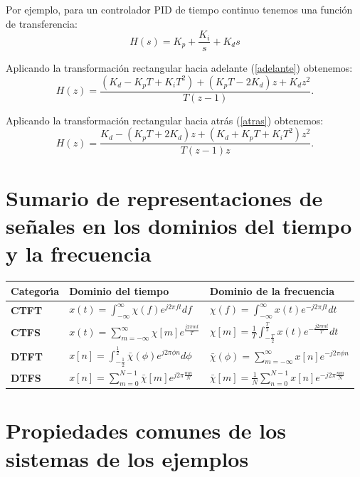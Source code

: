 \documentclass[11pt,a4paper,openany]{book}
\begin{document}
Por ejemplo, para un controlador PID de tiempo continuo tenemos una funci\'{o}n de transferencia:
\begin{equation}
	H(s) = K_{p} + \frac{K_{i}}{s} + K_{d} s
\end{equation}

Aplicando la transformaci\'{o}n rectangular hacia adelante (\ref{adelante}) obtenemos:
\begin{equation}
	H(z) = \frac{(K_{d} - K_{p} T + K_{i} T^{2}) + (K_{p} T - 2 K_{d}) z + K_{d} z^2}{T (z - 1)}.
\end{equation}

Aplicando la transformaci\'{o}n rectangular hacia atr\'{a}s (\ref{atras}) obtenemos:
\begin{equation}
	H(z) = \frac{K_{d} - (K_{p} T + 2 K_{d}) z + (K_{d} + K_{p} T + K_{i} T^{2}) z^2}{T (z - 1) z}.
\end{equation}

\section{Sumario de representaciones de se\~{n}ales en los dominios del tiempo y la frecuencia}

\begin{center}
	\renewcommand{\arraystretch}{2}
	\begin{tabular}{p{2cm} p{5.5cm} p{6cm}}
		\textbf{Categor\'{\i}a} & \textbf{Dominio del tiempo} & \textbf{Dominio de la frecuencia} \\ \hline
		\textbf{CTFT} & $x(t) =\int_{-\infty }^{\infty }\chi(f) e^{j2\pi ft}df$ & $\chi(f) =\int_{-\infty }^{\infty }x(t) e^{-j2\pi ft}dt$ \\ 
		\textbf{CTFS} & $x(t) =\sum_{m=-\infty }^{\infty }\chi[m] e^{\frac{j2\pi mt}{T}}$ & $\chi[m] =\frac{1}{T}\int_{-\frac{T}{2}}^{\frac{T}{2}}x(t) e^{-\frac{j2\pi mt}{T}}dt$ \\ 
		\textbf{DTFT} & $x[n] =\int_{-\frac{1}{2}}^{\frac{1}{2}}\bar{\chi}(\phi) e^{j2\pi \phi n}d\phi $ & $\bar{\chi}(\phi) =\sum_{m=-\infty }^{\infty }x[n] e^{-j2\pi \phi n}$ \\ 
		\textbf{DTFS} & $x[n] =\sum_{m=0}^{N-1}\bar{\chi}[m] e^{j2\pi \frac{mn}{N}}$ & $\bar{\chi}[m] =\frac{1}{N}\sum_{n=0}^{N-1}x[n] e^{-j2\pi \frac{mn}{N}}$
	\end{tabular}
\end{center}

\section{Propiedades comunes de los sistemas de los ejemplos}
\end{document}
